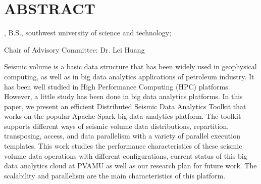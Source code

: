 %
%
%

\chapter*{ABSTRACT}

\pagestyle{plain} %
\setcounter{page}{2}

\begin{center}
\pvamumanuscripttitle

\pvamugradmonth \hspace{2pt} \pvamugradyear

\pvamufullname, B.S., southwest university of science and technology;

Chair of Advisory Committee: Dr. Lei Huang 

\par\end{center}

\indent Seismic volume is a basic data structure that has been widely used in geophysical computing, as well as in big data analytics applications of petroleum industry. It has been well studied in High Performance Computing (HPC) platforms. However, a little study has been done in big data analytics platforms. In this paper, we present an efficient Distributed Seismic Data Analytics Toolkit that works on the popular Apache Spark big data analytics platform. The toolkit supports different ways of seismic volume data distributions, repartition, transposing, access, and data parallelism with a variety of parallel execution templates. This work studies the performance characteristics of these seismic volume data operations with different configurations, current status of this big data analytics cloud at PVAMU as well as our research plan for future work. The scalability and parallelism are the main characteristics of this platform.  


 

\pagebreak{}
